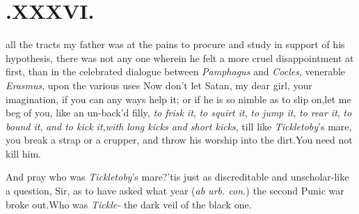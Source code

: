 \documentclass{article}
\begin{document}
\section{.\quad  XXXVI.}

 all the tracts my father was at
the pains to procure and study in support of his hypothesis, there
was not any one wherein he felt a more cruel disappointment at
first, than in the celebrated dialogue between \textit{Pamphagus} and
\textit{Cocles}, 
venerable \textit{Erasmus}, upon the various uses
\tsh Now don’t let Satan, my dear girl, 
your imagination, if you can any ways help it; or if he is so
nimble as to slip on,\tsh let me beg of you, like an un-\break back’d
filly, \textit{to frisk it}, 
\textit{to squirt it}, 
\textit{to jump it}, 
\textit{to rear it}, 
\textit{to bound it},\tsh 
\textit{and to kick it,\break with long kicks and short
kicks}, till like \textit{Tickletoby}’s mare, you break a
strap\break
or a crupper, and throw his worship\break
into the dirt.\tsh You need not kill\break
him.\tsh

\tsk And pray who was \textit{Tickletoby}’s
mare?\tsk ’tis just as discreditable and un\-scholar-like a
question, Sir, as to have asked what year (\textit{ab urb.\@
con.})\@
the second Punic war broke out.\tsk Who was
\textit{Tickle-}
the dark veil of the black one.
\end{document}
